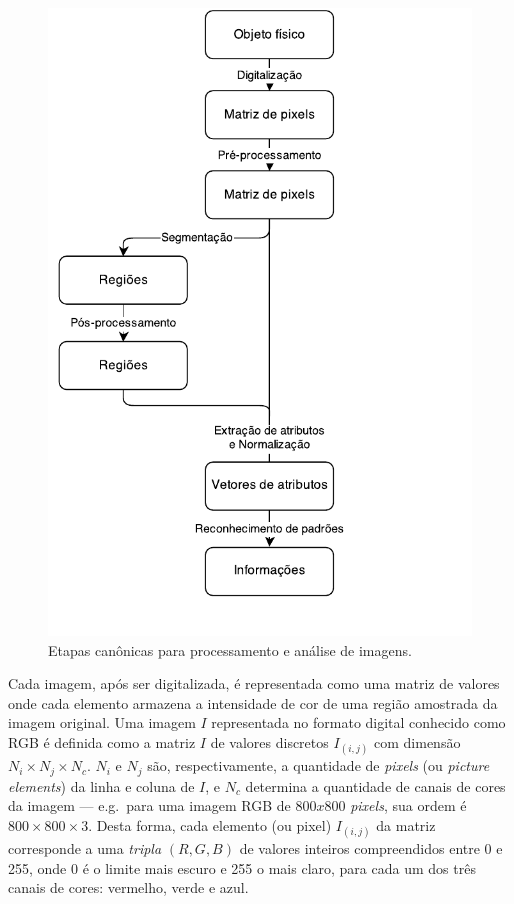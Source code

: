 \begin{figure}[ht!]
\begin{center}
        \includegraphics[scale=.6]{figs/etapas_pdi}
      \caption{Etapas canônicas para processamento e análise de imagens.}
        \label{fig:etapas-pdi}
\end{center}
\end{figure}

Cada imagem, após ser digitalizada, é representada como uma matriz de
valores onde cada elemento armazena a intensidade de cor de uma região
amostrada da imagem original. Uma imagem $I$ representada no formato
digital conhecido como RGB é definida como a matriz $I$ de valores
discretos $I_{(i,j)}$ com dimensão $N_i \times N_j \times N_c$. $N_i$
e $N_j$ são, respectivamente, a quantidade de \textit{pixels} (ou
\textit{picture elements}) da linha e coluna de $I$, e $N_c$ determina
a quantidade de canais de cores da imagem --- e.g.\ para uma imagem
RGB de $800 x 800$ \textit{pixels}, sua ordem é $800 \times 800 \times
3$. Desta forma, cada elemento (ou pixel) $I_{(i,j)}$ da matriz
corresponde a uma \emph{tripla} $(R, G, B)$ de valores inteiros
compreendidos entre 0 e 255, onde 0 é o limite mais escuro e 255 o
mais claro, para cada um dos três canais de cores: vermelho, verde e
azul.

